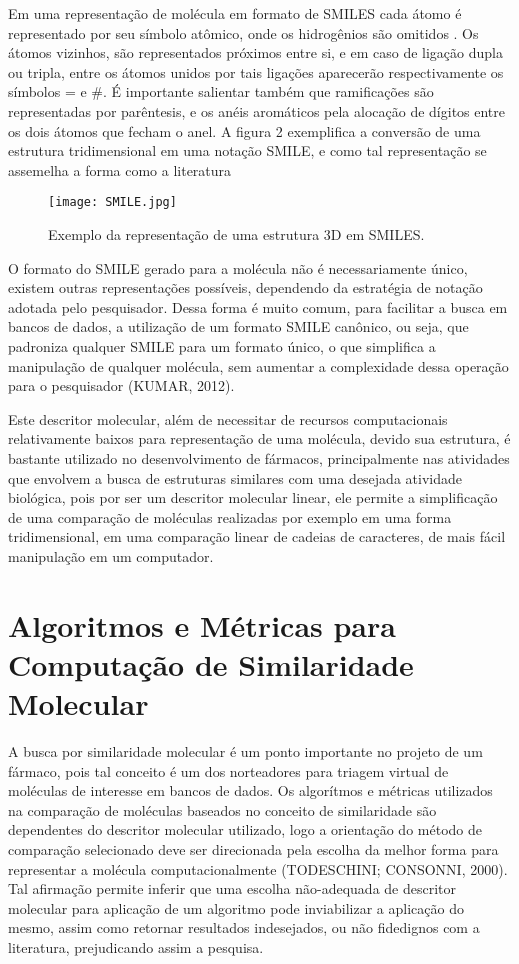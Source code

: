 Em uma representação de molécula em formato de SMILES cada átomo é representado por seu símbolo atômico, onde os hidrogênios são omitidos \cite{anderson1987smiles}. Os átomos vizinhos, são representados próximos entre si, e em caso de ligação dupla ou tripla, entre os átomos unidos por tais ligações aparecerão respectivamente os símbolos = e \#. É importante salientar também que ramificações são representadas por parêntesis, e os anéis aromáticos pela alocação de dígitos entre os dois átomos que fecham o anel. A figura 2 exemplifica a conversão de uma estrutura tridimensional em uma notação SMILE, e como tal representação se assemelha a forma como a literatura

\begin{figure}[!htb]
	\centering
	\caption[Exemplo de Molécula representada em SMILE]{Exemplo da representação de uma estrutura 3D em SMILES.}
	\texttt{[image: SMILE.jpg]} %
	\label{fig:dummy}
\end{figure}

O formato do SMILE gerado para a molécula não é necessariamente único, existem
outras representações possíveis, dependendo da estratégia de notação adotada pelo 
pesquisador. Dessa forma é muito comum, para facilitar a busca em bancos de dados, a 
utilização de um formato SMILE canônico, ou seja, que padroniza qualquer SMILE para um 
formato único, o que simplifica a manipulação de qualquer molécula, sem aumentar a 
complexidade dessa operação para o pesquisador (KUMAR, 2012).

Este descritor molecular, além de necessitar de recursos computacionais relativamente 
baixos para representação de uma molécula, devido sua estrutura, é 
bastante utilizado no desenvolvimento de fármacos, principalmente nas atividades que 
envolvem a busca de estruturas similares com uma desejada atividade biológica, pois por ser 
um descritor molecular linear, ele permite a simplificação de uma comparação de moléculas 
realizadas por exemplo em uma forma tridimensional, em uma comparação linear de cadeias 
de caracteres, de mais fácil manipulação em um computador. 

\section{Algoritmos e Métricas para Computação de Similaridade Molecular}

A busca por similaridade molecular é um ponto importante no projeto de um
fármaco, pois tal conceito é um dos norteadores para triagem virtual de moléculas de interesse em bancos de dados. Os algorítmos e métricas utilizados na comparação de moléculas baseados no conceito de similaridade são dependentes do descritor molecular utilizado, logo a orientação do método de comparação selecionado deve ser direcionada pela escolha da melhor forma para representar a molécula computacionalmente (TODESCHINI; CONSONNI, 2000). Tal afirmação permite inferir que uma escolha não-adequada de descritor molecular para aplicação de um algoritmo pode inviabilizar a aplicação do mesmo, assim como retornar resultados indesejados, ou não fidedignos com a literatura, prejudicando assim a pesquisa.

